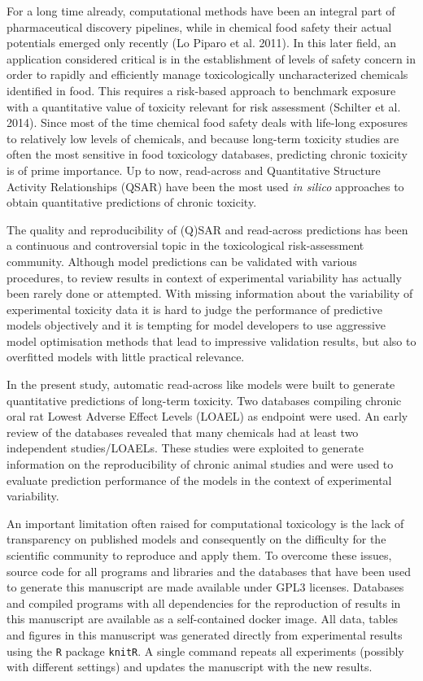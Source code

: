 \documentclass[]{achemso}
\begin{document}
For a long time already, computational methods have been an integral
part of pharmaceutical discovery pipelines, while in chemical food
safety their actual potentials emerged only recently (Lo Piparo et al.
2011). In this later field, an application considered critical is in the
establishment of levels of safety concern in order to rapidly and
efficiently manage toxicologically uncharacterized chemicals identified
in food. This requires a risk-based approach to benchmark exposure with
a quantitative value of toxicity relevant for risk assessment (Schilter
et al. 2014). Since most of the time chemical food safety deals with
life-long exposures to relatively low levels of chemicals, and because
long-term toxicity studies are often the most sensitive in food
toxicology databases, predicting chronic toxicity is of prime
importance. Up to now, read-across and Quantitative Structure Activity
Relationships (QSAR) have been the most used \emph{in silico} approaches
to obtain quantitative predictions of chronic toxicity.

The quality and reproducibility of (Q)SAR and read-across predictions
has been a continuous and controversial topic in the toxicological
risk-assessment community. Although model predictions can be validated
with various procedures, to review results in context of experimental
variability has actually been rarely done or attempted. With missing
information about the variability of experimental toxicity data it is
hard to judge the performance of predictive models objectively and it is
tempting for model developers to use aggressive model optimisation
methods that lead to impressive validation results, but also to
overfitted models with little practical relevance.

In the present study, automatic read-across like models were built to
generate quantitative predictions of long-term toxicity. Two databases
compiling chronic oral rat Lowest Adverse Effect Levels (LOAEL) as
endpoint were used. An early review of the databases revealed that many
chemicals had at least two independent studies/LOAELs. These studies
were exploited to generate information on the reproducibility of chronic
animal studies and were used to evaluate prediction performance of the
models in the context of experimental variability.

An important limitation often raised for computational toxicology is the
lack of transparency on published models and consequently on the
difficulty for the scientific community to reproduce and apply them. To
overcome these issues, source code for all programs and libraries and
the databases that have been used to generate this manuscript are made
available under GPL3 licenses. Databases and compiled programs with all
dependencies for the reproduction of results in this manuscript are
available as a self-contained docker image. All data, tables and figures
in this manuscript was generated directly from experimental results
using the \texttt{R} package \texttt{knitR}. A single command repeats
all experiments (possibly with different settings) and updates the
manuscript with the new results.
\end{document}
